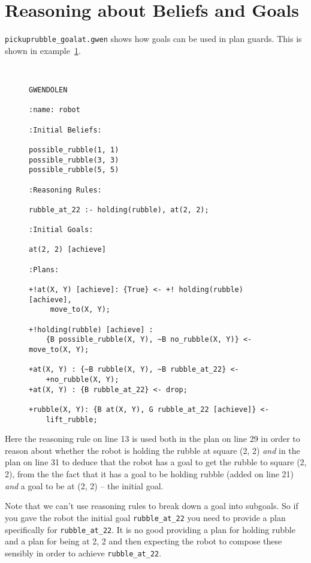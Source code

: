 \section{Reasoning about Beliefs and Goals}
\texttt{pickuprubble\_goalat.gwen} shows how goals can be used in plan guards.  This is shown in example~\ref{code:pickuprubble_goalat}.
\begin{figure}[htb]
\begin{ourexample}
\label{code:pickuprubble_goalat} \quad \\
\begin{lstlisting}[basicstyle=\sffamily,style=easslisting,language=Gwendolen]
GWENDOLEN

:name: robot

:Initial Beliefs:

possible_rubble(1, 1)
possible_rubble(3, 3)
possible_rubble(5, 5)

:Reasoning Rules:

rubble_at_22 :- holding(rubble), at(2, 2);

:Initial Goals:

at(2, 2) [achieve]

:Plans:

+!at(X, Y) [achieve]: {True} <- +! holding(rubble)[achieve],
     move_to(X, Y);

+!holding(rubble) [achieve] : 
    {B possible_rubble(X, Y), ~B no_rubble(X, Y)} <- move_to(X, Y);

+at(X, Y) : {~B rubble(X, Y), ~B rubble_at_22} <- 
    +no_rubble(X, Y);
+at(X, Y) : {B rubble_at_22} <- drop;

+rubble(X, Y): {B at(X, Y), G rubble_at_22 [achieve]} <- 
    lift_rubble;
\end{lstlisting}
\end{ourexample}
\end{figure}
Here the reasoning rule on line 13 is used both in the plan on line 29 in order to reason about whether the robot is holding the rubble at square (2, 2) \emph{and} in the plan on line 31 to deduce that the robot has a goal to get the rubble to square (2, 2), from the the fact that it has a goal to be holding rubble (added on line 21) \emph{and} a goal to be at (2, 2) -- the initial goal.

Note that we can't use reasoning rules to break down a goal into subgoals.  So if you gave the robot the initial goal \lstinline{rubble_at_22} you need to provide a plan specifically for \lstinline{rubble_at_22}.  It is no good providing a plan for holding rubble and a plan for being at 2, 2 and then expecting the robot to compose these sensibly in order to achieve \lstinline{rubble_at_22}.

